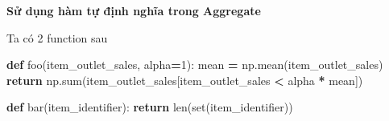 \documentclass[
]{book}
\newenvironment{Shaded}{\begin{snugshade}}{\end{snugshade}}
\newcommand{\BuiltInTok}[1]{#1}
\newcommand{\ControlFlowTok}[1]{\textcolor[rgb]{0.13,0.29,0.53}{\textbf{#1}}}
\newcommand{\DecValTok}[1]{\textcolor[rgb]{0.00,0.00,0.81}{#1}}
\newcommand{\KeywordTok}[1]{\textcolor[rgb]{0.13,0.29,0.53}{\textbf{#1}}}
\newcommand{\NormalTok}[1]{#1}
\newcommand{\OperatorTok}[1]{\textcolor[rgb]{0.81,0.36,0.00}{\textbf{#1}}}
\begin{document}
\textbf{Sử dụng hàm tự định nghĩa trong Aggregate}

Ta có 2 function sau

\begin{Shaded}
\begin{Highlighting}[]
\KeywordTok{def}\NormalTok{ foo(item\_outlet\_sales, alpha}\OperatorTok{=}\DecValTok{1}\NormalTok{):}
\NormalTok{    mean }\OperatorTok{=}\NormalTok{ np.mean(item\_outlet\_sales)}
    \ControlFlowTok{return}\NormalTok{ np.}\BuiltInTok{sum}\NormalTok{(item\_outlet\_sales[item\_outlet\_sales }\OperatorTok{\textless{}}\NormalTok{ alpha }\OperatorTok{*}\NormalTok{ mean])}

\KeywordTok{def}\NormalTok{ bar(item\_identifier):}
    \ControlFlowTok{return} \BuiltInTok{len}\NormalTok{(}\BuiltInTok{set}\NormalTok{(item\_identifier))}
\end{Highlighting}
\end{Shaded}
\end{document}
